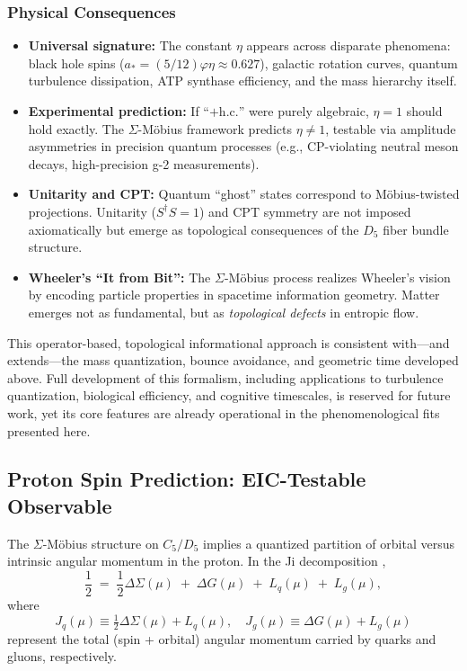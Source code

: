 \documentclass[12pt]{article}
\begin{document}
\subsubsection{Physical Consequences}

\begin{itemize}
    \item \textbf{Universal signature:} The constant $\eta$ appears across disparate phenomena: black hole spins ($a_* = (5/12)\varphi\eta \approx 0.627$), galactic rotation curves, quantum turbulence dissipation, ATP synthase efficiency, and the mass hierarchy itself.
    
    \item \textbf{Experimental prediction:} If ``$+ \text{h.c.}$'' were purely algebraic, $\eta=1$ should hold exactly. The $\Sigma$-M\"obius framework predicts $\eta \neq 1$, testable via amplitude asymmetries in precision quantum processes (e.g., CP-violating neutral meson decays, high-precision g-2 measurements).
    
    \item \textbf{Unitarity and CPT:} Quantum ``ghost'' states correspond to M\"obius-twisted projections. Unitarity ($S^\dagger S = 1$) and CPT symmetry are not imposed axiomatically but emerge as topological consequences of the $D_5$ fiber bundle structure.
    
    \item \textbf{Wheeler's ``It from Bit'':} The $\Sigma$-M\"obius process realizes Wheeler's vision \cite{wheeler1990} by encoding particle properties in spacetime information geometry. Matter emerges not as fundamental, but as \textit{topological defects} in entropic flow.
\end{itemize}

This operator-based, topological informational approach is consistent with—and extends—the mass quantization, bounce avoidance, and geometric time developed above. Full development of this formalism, including applications to turbulence quantization, biological efficiency, and cognitive timescales, is reserved for future work, yet its core features are already operational in the phenomenological fits presented here.

\subsection{Proton Spin Prediction: EIC-Testable Observable}
\label{sec:proton_spin}

The $\Sigma$-M\"obius structure on $C_5/D_5$ implies a quantized partition of orbital versus intrinsic angular momentum in the proton. In the Ji decomposition \cite{ji2020proton},
\begin{equation}
\frac{1}{2} \;=\; \frac{1}{2}\Delta\Sigma(\mu) \;+\; \Delta G(\mu) \;+\; L_q(\mu) \;+\; L_g(\mu),
\end{equation}
where
\begin{equation}
J_q(\mu) \equiv \tfrac{1}{2}\Delta\Sigma(\mu) + L_q(\mu),\quad
J_g(\mu) \equiv \Delta G(\mu) + L_g(\mu)
\end{equation}
represent the total (spin + orbital) angular momentum carried by quarks and gluons, respectively.
\end{document}
